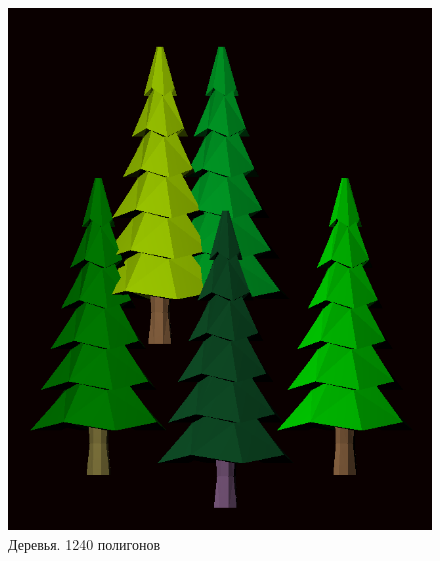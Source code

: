 \begin{figure}[H]
	\begin{center}
		\includegraphics[scale=0.5]{images/tree}
	\end{center}
	\captionsetup{justification=centering}
	\caption{Деревья. 1240 полигонов}
	\label{img:s1}
\end{figure}


